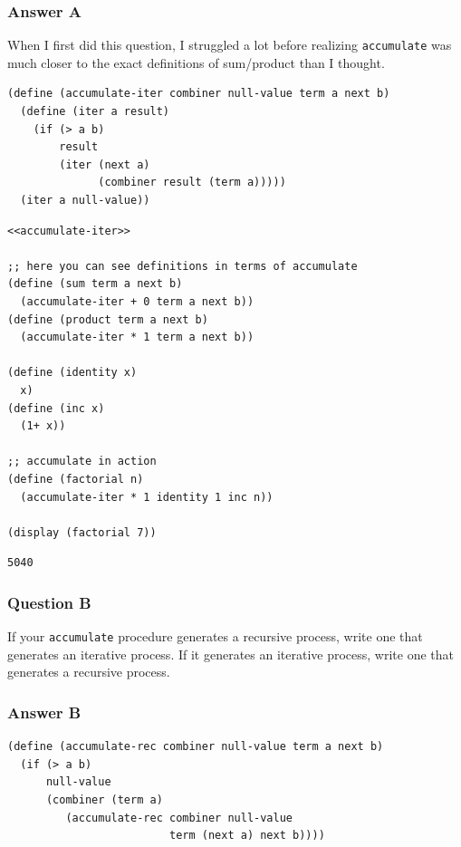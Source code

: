 \documentclass[final,fleqn,titlepage,twoside]{article}
\begin{document}
\subsubsection{Answer A}
\label{sec:org3a25b80}
When I first did this question, I struggled a lot before realizing
\texttt{accumulate} was much closer to the exact definitions of sum/product
than I thought.
\begin{verbatim}
(define (accumulate-iter combiner null-value term a next b)
  (define (iter a result)
    (if (> a b)
        result
        (iter (next a)
              (combiner result (term a)))))
  (iter a null-value))
\end{verbatim}

\begin{verbatim}
<<accumulate-iter>>

;; here you can see definitions in terms of accumulate
(define (sum term a next b)
  (accumulate-iter + 0 term a next b))
(define (product term a next b)
  (accumulate-iter * 1 term a next b))

(define (identity x)
  x)
(define (inc x)
  (1+ x))

;; accumulate in action
(define (factorial n)
  (accumulate-iter * 1 identity 1 inc n))

(display (factorial 7))
\end{verbatim}

\begin{verbatim}
5040
\end{verbatim}

\subsubsection{Question B}
\label{sec:orgc43c55f}
If your \texttt{accumulate} procedure generates a recursive process, write
one that generates an iterative process. If it generates an iterative process,
write one that generates a recursive process.

\subsubsection{Answer B}
\label{sec:org82038d7}
\begin{verbatim}
(define (accumulate-rec combiner null-value term a next b)
  (if (> a b)
      null-value
      (combiner (term a)
         (accumulate-rec combiner null-value
                         term (next a) next b))))
\end{verbatim}
\end{document}
